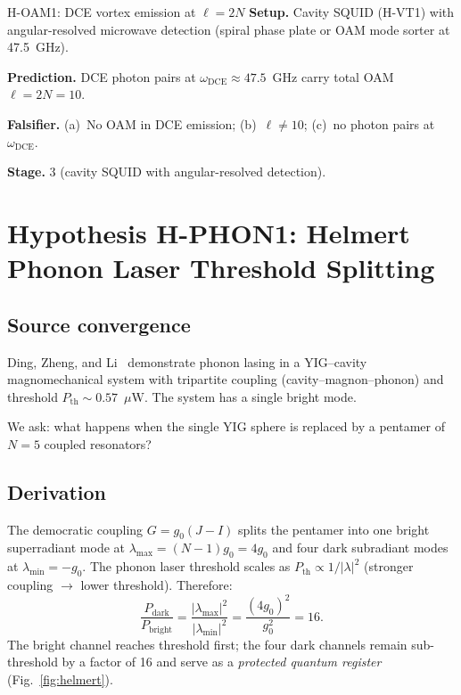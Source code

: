 \documentclass[11pt,letterpaper]{article}
\newcommand{\microwatt}{\ensuremath{\mu\mathrm{W}}}
\newcommand{\gzero}{g_0}
\begin{document}
\begin{hypothesis}{H-OAM1: DCE vortex emission at $\ell = 2N$}
\textbf{Setup.}  Cavity SQUID (H-VT1) with angular-resolved microwave detection (spiral phase plate or OAM mode sorter at 47.5~GHz).

\textbf{Prediction.}  DCE photon pairs at $\omega_{\mathrm{DCE}} \approx 47.5$~GHz carry total OAM $\ell = 2N = 10$.

\textbf{Falsifier.}  (a)~No OAM in DCE emission; (b)~$\ell \neq 10$; (c)~no photon pairs at $\omega_{\mathrm{DCE}}$.

\textbf{Stage.}  3 (cavity SQUID with angular-resolved detection).
\end{hypothesis}


\section{Hypothesis H-PHON1: Helmert Phonon Laser Threshold Splitting}\label{sec:hphon1}

\subsection{Source convergence}
Ding, Zheng, and Li~\cite{Ding2019} demonstrate phonon lasing in a YIG--cavity magnomechanical system with tripartite coupling (cavity--magnon--phonon) and threshold $P_{\mathrm{th}} \sim 0.57$~\microwatt{}.  The system has a single bright mode.

We ask: what happens when the single YIG sphere is replaced by a pentamer of $N = 5$ coupled resonators?

\subsection{Derivation}
The democratic coupling $G = \gzero(J - I)$ splits the pentamer into one bright superradiant mode at $\lambda_{\max} = (N{-}1)\gzero = 4\gzero$ and four dark subradiant modes at $\lambda_{\min} = -\gzero$.
The phonon laser threshold scales as $P_{\mathrm{th}} \propto 1/|\lambda|^2$ (stronger coupling $\to$ lower threshold).  Therefore:
\begin{equation}\label{eq:threshold_ratio}
  \frac{P_{\mathrm{dark}}}{P_{\mathrm{bright}}} = \frac{|\lambda_{\max}|^2}{|\lambda_{\min}|^2} = \frac{(4\gzero)^2}{\gzero^2} = 16.
\end{equation}
The bright channel reaches threshold first; the four dark channels remain sub-threshold by a factor of 16 and serve as a \emph{protected quantum register} (Fig.~\ref{fig:helmert}).
\end{document}
